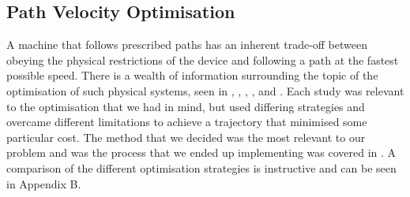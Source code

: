 \subsection{Path Velocity Optimisation}
A machine that follows prescribed paths has an inherent trade-off between obeying the physical restrictions of the device and following a path at the fastest possible speed. There is a wealth of information surrounding the topic of the optimisation of such physical systems, seen in \cite{Bardine10},  \cite{Chen07}, \cite{Choi01}, \cite{Tseng09}, \cite{Schutter09} and \cite{Yeh99}. Each study was relevant to the optimisation that we had in mind, but used differing strategies and overcame different limitations to achieve a trajectory that minimised some particular cost. The method that we decided was the most relevant to our problem and was the process that we ended up implementing was covered in \cite{Schutter09}. A comparison of the different optimisation strategies is instructive and can be seen in Appendix B.

